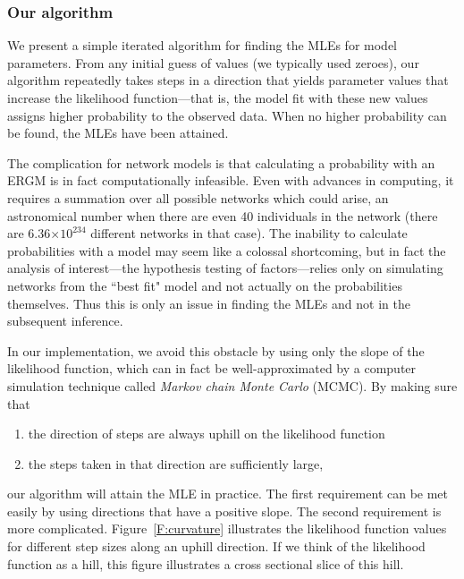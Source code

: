 \documentclass[12pt]{article}
\begin{document}

\subsubsection{Our algorithm}
We present a simple iterated algorithm for finding the MLEs for model parameters.
From any initial guess of values (we typically used zeroes), 
our algorithm repeatedly takes steps in a direction that 
yields parameter values that increase the likelihood function---that is, the model 
fit with these new values assigns higher probability to the observed data.    
When no higher probability can be found, the MLEs have been attained.  

The complication for network models is that 
calculating a probability with an ERGM is in fact computationally infeasible. 
Even with advances in computing, 
it requires a summation over all possible networks which could arise, 
an astronomical number when there are even 40 individuals in the network 
(there are 6.36$\times10^{234}$ different networks in that case).  
The inability to calculate probabilities with a model may seem 
like a colossal shortcoming, but in fact the analysis of interest---the 
hypothesis testing of factors---relies only on simulating 
networks from the ``best fit" model and not actually on the probabilities 
themselves.  Thus this is only an issue in finding the MLEs and not in 
the subsequent inference.

In our implementation, we avoid this obstacle by using only the slope of 
the likelihood function, which can in fact be well-approximated by 
a computer simulation technique called \emph{Markov chain Monte Carlo} (MCMC).  
By making sure that
\begin{enumerate}
\item the direction of steps are always uphill on the likelihood function
\item the steps taken in that direction are sufficiently large,
\end{enumerate}
our algorithm will attain the MLE in practice.  The first requirement can be met 
easily by using directions that have a positive slope.  The second requirement
is more complicated. 
Figure~\ref{F:curvature} illustrates the likelihood function values 
for different step sizes along an uphill direction.  
If we think of the likelihood function as a hill, this 
figure illustrates a cross sectional slice of this hill.
\end{document}
